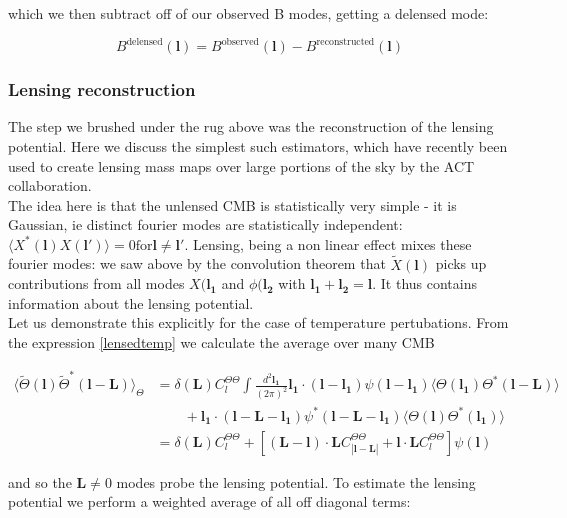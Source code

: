 \documentclass[a4paper,10pt]{article}
\renewcommand{\v}[1]{\mathbf{#1}}
\newcommand{\finttwo}[1]{\int \frac{d^2 \v{#1}}{(2\pi)^2}}
\begin{document}
which we then subtract off of our observed B modes, getting a delensed mode:

\begin{equation}
B^{\text{delensed}}(\v{l}) = B^{\text{observed}}(\v{l}) - B^{\text{reconstructed}}(\v{l})
\end{equation}

\subsubsection{Lensing reconstruction}

The step we brushed under the rug above was the reconstruction of the lensing potential. Here we discuss the simplest such estimators, which have recently been used to create lensing mass maps over large portions of the sky by the ACT collaboration. \\

The idea here is that the unlensed CMB is statistically very simple - it is Gaussian, ie distinct fourier modes are statistically independent: $\langle X^*(\v{l})X(\v{l'})\rangle =0 \text{for} \v{l} \neq \v{l'}$. Lensing, being a non linear effect mixes these fourier modes: we saw above by the convolution theorem that  $\tilde{X}(\v{l})$ picks up contributions from all modes ${X}(\v{l_1}$ and $\phi(\v{l_2}$ with $\v{l_1}+\v{l_2}=\v{l}$. It thus contains information about the lensing potential.\\

Let us demonstrate this explicitly for the case of temperature pertubations. From the expression \ref{lensedtemp} we calculate the average over many CMB

\begin{equation}\begin{split}
\langle \tilde{\Theta}(\v{l})\tilde{\Theta}^*(\v{l}-\v{L})\rangle_{\Theta} &= \delta(\v{L})C_l^{\Theta\Theta} \finttwo{l_1}  \v{l_1}\cdot(\v{l}-\v{l_1})\psi(\v{l}-\v{l_1}) \langle \Theta(\v{l_1})\Theta^*(\v{l}-\v{L})\rangle \\
&\qquad + \v{l_1}\cdot(\v{l}-\v{L}-\v{l_1})\psi^*(\v{l}-\v{L}-\v{l_1}) \langle \Theta(\v{l})\Theta^*(\v{l_1})\rangle\\
&=\delta(\v{L})C_l^{\Theta\Theta} + [(\v{L}-\v{l})\cdot\v{L}C^{\Theta\Theta}_{|\v{l}-\v{L}|}+\v{l}\cdot\v{L}C_l^{\Theta\Theta}]\psi(\v{l})
\end{split}\end{equation}

and so the $\v{L}\neq 0 $ modes probe the lensing potential. To estimate the lensing potential we perform a weighted average of all off diagonal terms:
\end{document}

